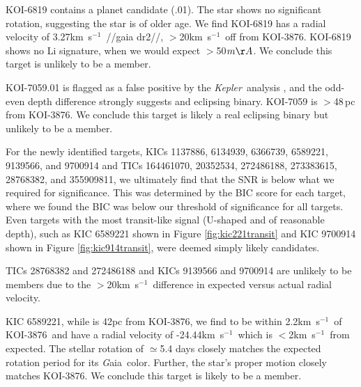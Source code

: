 \documentclass[twocolumn]{aastex631}
\newcommand{\starname}{KOI-3876}
\newcommand{\kepler}{{\it Kepler}}
\newcommand\kms{km~s$^{-1}$}
\newcommand{\gaia}{{\textit Gaia}}
\begin{document}

KOI-6819 contains a planet candidate (.01). The star shows no significant rotation, suggesting the star is of older age. We find KOI-6819 has a radial velocity of 3.27\kms\ //gaia dr2//, $>$20\kms\ off from \starname. KOI-6819 shows no Li signature, when we would expect $>$50$m\AA$. We conclude this target is unlikely to be a member. 

KOI-7059.01 is flagged as a false positive by the \kepler\ analysis \citep{2016ApJS..224...12C}, and the odd-even depth difference strongly suggests and eclipsing binary. KOI-7059 is $>$48\,pc from \starname. We conclude this target is likely a real eclipsing binary but unlikely to be a member.

For the newly identified targets, KICs 1137886, 6134939, 6366739, 6589221, 9139566, and 9700914 and TICs 164461070, 20352534, 272486188, 273383615, 28768382, and 355909811, we ultimately find that the SNR is below what we required for significance. This was determined by the BIC score for each target, where we found the BIC was below our threshold of significance for all targets. Even targets with the most transit-like signal (U-shaped and of reasonable depth), such as KIC 6589221 shown in Figure \ref{fig:kic221transit} and KIC 9700914 shown in Figure \ref{fig:kic914transit}, were deemed simply likely candidates. 

TICs 28768382 and 272486188 and KICs 9139566 and 9700914 are unlikely to be members due to the $>$20\kms\ difference in expected versus actual radial velocity. %

KIC 6589221, while is 42pc from \starname, we find to be within 2.2\kms\ of \starname\ and have a radial velocity of -24.44\kms\, which is $<$2\kms\ from expected. The stellar rotation of $\simeq$5.4 days closely matches the expected rotation period for its \gaia\ color. Further, the star's proper motion closely matches \starname. We conclude this target is likely to be a member.
\end{document}
